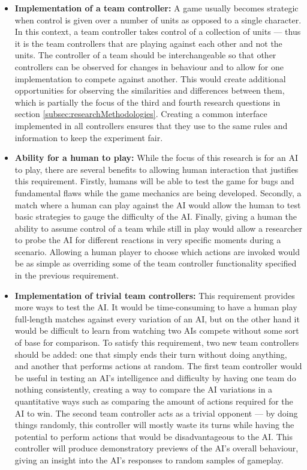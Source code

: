 \documentclass[11pt, a4paper]{report}
\begin{document}
\begin{itemize}
\item \textbf{Implementation of a team controller:}
A game usually becomes strategic when control is given over a number of units as opposed to a single character. In this context, a team controller takes control of a collection of units --- thus it is the team controllers that are playing against each other and not the units. The controller of a team should be interchangeable so that other controllers can be observed for changes in behaviour and to allow for one implementation to compete against another. This would create additional opportunities for observing the similarities and differences between them, which is partially the focus of the third and fourth research questions in section \ref{subsec:researchMethodologies}. Creating a common interface implemented in all controllers ensures that they use to the same rules and information to keep the experiment fair.

\item \textbf{Ability for a human to play:}
While the focus of this research is for an AI to play, there are several benefits to allowing human interaction that justifies this requirement. Firstly, humans will be able to test the game for bugs and fundamental flaws while the game mechanics are being developed. Secondly, a match where a human can play against the AI would allow the human to test basic strategies to gauge the difficulty of the AI. Finally, giving a human the ability to assume control of a team while still in play would allow a researcher to probe the AI for different reactions in very specific moments during a scenario. Allowing a human player to choose which actions are invoked would be as simple as overriding some of the team controller functionality specified in the previous requirement.

\item \textbf{Implementation of trivial team controllers:}
This requirement provides more ways to test the AI. It would be time-consuming to have a human play full-length matches against every variation of an AI, but on the other hand it would be difficult to learn from watching two AIs compete without some sort of base for comparison. To satisfy this requirement, two new team controllers should be added: one that simply ends their turn without doing anything, and another that performs actions at random. The first team controller would be useful in testing an AI's intelligence and difficulty by having one team do nothing consistently, creating a way to compare the AI variations in a quantitative ways such as comparing the amount of actions required for the AI to win. The second team controller acts as a trivial opponent --- by doing things randomly, this controller will mostly waste its turns while having the potential to perform actions that would be disadvantageous to the AI. This controller will produce demonstratory previews of the AI's overall behaviour, giving an insight into the AI's responses to random samples of gameplay.


\end{itemize}
\end{document}
